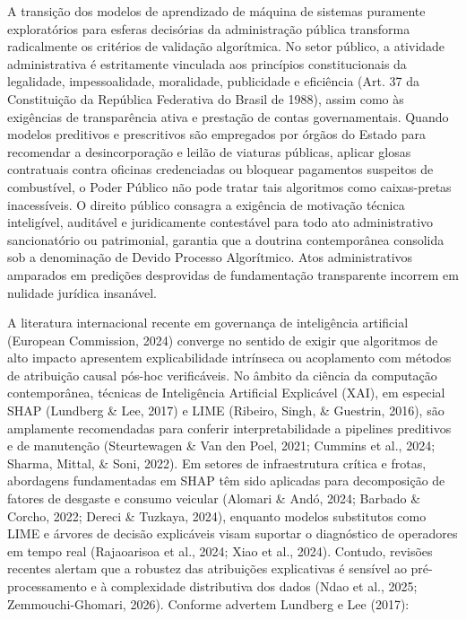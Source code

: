 \documentclass[12pt,a4paper]{article}
\begin{document}
A transição dos modelos de aprendizado de máquina de sistemas puramente exploratórios para esferas decisórias da administração pública transforma radicalmente os critérios de validação algorítmica. No setor público, a atividade administrativa é estritamente vinculada aos princípios constitucionais da legalidade, impessoalidade, moralidade, publicidade e eficiência (Art. 37 da Constituição da República Federativa do Brasil de 1988), assim como às exigências de transparência ativa e prestação de contas governamentais. Quando modelos preditivos e prescritivos são empregados por órgãos do Estado para recomendar a desincorporação e leilão de viaturas públicas, aplicar glosas contratuais contra oficinas credenciadas ou bloquear pagamentos suspeitos de combustível, o Poder Público não pode tratar tais algoritmos como caixas-pretas inacessíveis. O direito público consagra a exigência de motivação técnica inteligível, auditável e juridicamente contestável para todo ato administrativo sancionatório ou patrimonial, garantia que a doutrina contemporânea consolida sob a denominação de Devido Processo Algorítmico. Atos administrativos amparados em predições desprovidas de fundamentação transparente incorrem em nulidade jurídica insanável.

A literatura internacional recente em governança de inteligência artificial (European Commission, 2024) converge no sentido de exigir que algoritmos de alto impacto apresentem explicabilidade intrínseca ou acoplamento com métodos de atribuição causal pós-hoc verificáveis. No âmbito da ciência da computação contemporânea, técnicas de Inteligência Artificial Explicável (XAI), em especial SHAP (Lundberg \& Lee, 2017) e LIME (Ribeiro, Singh, \& Guestrin, 2016), são amplamente recomendadas para conferir interpretabilidade a pipelines preditivos e de manutenção (Steurtewagen \& Van den Poel, 2021; Cummins et al., 2024; Sharma, Mittal, \& Soni, 2022). Em setores de infraestrutura crítica e frotas, abordagens fundamentadas em SHAP têm sido aplicadas para decomposição de fatores de desgaste e consumo veicular (Alomari \& Andó, 2024; Barbado \& Corcho, 2022; Dereci \& Tuzkaya, 2024), enquanto modelos substitutos como LIME e árvores de decisão explicáveis visam suportar o diagnóstico de operadores em tempo real (Rajaoarisoa et al., 2024; Xiao et al., 2024). Contudo, revisões recentes alertam que a robustez das atribuições explicativas é sensível ao pré-processamento e à complexidade distributiva dos dados (Ndao et al., 2025; Zemmouchi-Ghomari, 2026). Conforme advertem Lundberg e Lee (2017):
\end{document}
